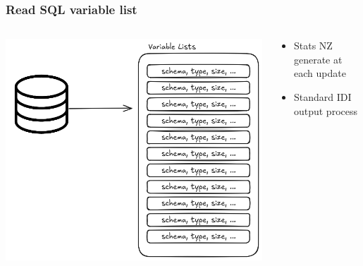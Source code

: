 \documentclass[aspectratio=169]{beamer}
\begin{document}
\begin{frame}
    \frametitle{Read SQL variable list}

    \begin{columns}
        \begin{column}{0.5\textwidth}
            \begin{center}
                \includegraphics[width=0.8\linewidth]{dd-sql.png}
            \end{center}
        \end{column}
        \begin{column}{0.5\textwidth}
            \begin{itemize}
                \item Stats NZ generate at each update
                \item Standard IDI output process
            \end{itemize}
        \end{column}
    \end{columns}

\end{frame}
\end{document}
